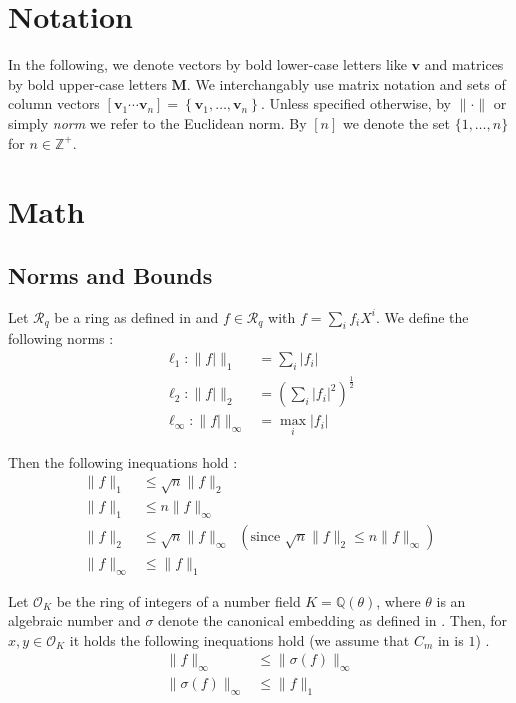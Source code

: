 \documentclass[
  a4paper,  %
  twoside,  %
  bibliography=totoc,
  headsepline,
  cleardoublepage=empty,
  parskip=half,
  draft=false
]{scrbook}
\begin{document}
\section{Notation}
In the following, we denote vectors by bold lower-case letters like $\mathbf{v}$ and matrices by bold upper-case letters $\mathbf{M}$. We interchangably use matrix notation and sets of column vectors $\left[\mathbf{v}_1 \cdots \mathbf{v}_n\right] = \left\{\mathbf{v}_1, \dots, \mathbf{v}_n\right\}$. Unless specified otherwise, by $\| \cdot \|$ or simply \textit{norm} we refer to the Euclidean norm. By $[n]$ we denote the set $\{1, \dots, n\}$ for $n\in \mathbb{Z}^+$.  


\section{Math} 

\subsection{Norms and Bounds} %
Let $\mathcal{R}_q$ be a ring as defined in \cite{BDLOP18} and $f \in \mathcal{R}_q$ with $f = \sum_i f_i X^i$. We define the following norms \cite{BDLOP18}:
\begin{align}
  \ell_1 : \| f| \|_1 &= \sum_i |f_i|\\
  \ell_2 : \| f| \|_2 &= \left(\sum_i |f_i|^2\right) ^{\frac{1}{2}}\\
  \ell_\infty : \| f| \|_\infty &= \max_i |f_i|
\end{align}

Then the following inequations hold \cite{BDLOP18}:
\begin{align}
  \| f \|_1 &\leq \sqrt{n} \| f \|_2 \label{norm1}\\
  \| f \|_1 &\leq n \| f \|_\infty \label{norm2}\\
  \| f \|_2 &\leq \sqrt{n} \| f \|_\infty \;\;(\text{since }  \sqrt{n} \| f \|_2 \leq n \| f \|_\infty) \label{norm3}\\
  \| f \|_\infty& \leq \| f \|_1 \label{norm4}
\end{align}

Let $\mathcal{O}_K$ be the ring of integers of a number field $K=\mathbb{Q}(\theta)$, where $\theta$ is an algebraic number and $\sigma$ denote the canonical embedding as defined in \cite{DPSZ12}. Then, for $x, y \in \mathcal{O}_K$ it holds the following inequations hold (we assume that $C_m$ in \cite{DPSZ12} is $1$) \cite{DPSZ12}. 
\begin{align}
  \| f \|_\infty &\leq \| \sigma(f) \|_\infty \label{norm5}\\
  \| \sigma(f) \|_\infty &\leq \| f \|_1 \label{norm6}
\end{align}
\end{document}

